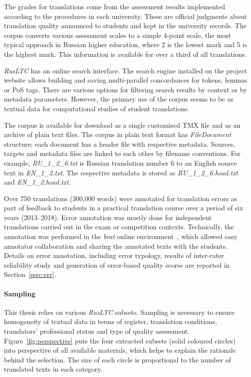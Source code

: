 
The grades for translations come from the assessment results implemented according to the procedures in each university. These are official judgments about translation quality announced to students and kept in the university records. The corpus converts various assessment scales to a simple 4-point scale, the most typical approach in Russian higher education, where 2 is the lowest mark and 5 is the highest mark. This information is available for over a third of all translations. 

\textit{RusLTC} has an online search interface. The search engine installed on the project website allows building and saving multi-parallel concordances for tokens, lemmas or PoS tags. There are various options for filtering search results by context or by metadata parameters. However, the primary use of the corpus seems to be as textual data for computational studies of student translations.

The corpus is available for download as a single customised TMX file and as an archive of plain text files. The corpus in plain text format has \textit{FileDocument} structure; each document has a header file with respective metadata. Sources, targets and metadata files are linked to each other by filename conventions. For example, \textit{RU\_1\_2\_6.txt} is Russian translation number 6 to an English source text in \textit{EN\_1\_2.txt}. The respective metadata is stored as \textit{RU\_1\_2\_6.head.txt} and \textit{EN\_1\_2.head.txt}.

Over 750 translations (300,000 words) were annotated for translation errors as part of feedback to students in a practical translation course over a period of six years (2013--2018). Error annotation was mostly done for independent translations carried out in the exam or competition contexts. Technically, the annotation was performed in the \textit{brat} online environment~\cite{Stenetorp2012}, which allowed easy annotator collaboration and sharing the annotated texts with the students. Details on error annotation, including error typology, results of inter-rater reliability study and generation of error-based quality scores are reported in Section~\ref{ssec:err}.

\paragraph{Sampling} This thesis relies on various \textit{RusLTC} subsets. Sampling is necessary to ensure homogeneity of textual data in terms of register, translation conditions, translators' professional status and type of quality assessment. Figure~\ref{fig:perspective} puts the four extracted subsets (solid coloured circles) into perspective of all available materials, which helps to explain the rationale behind the selection.
The size of each circle is proportional to the number of translated texts in each category. %

